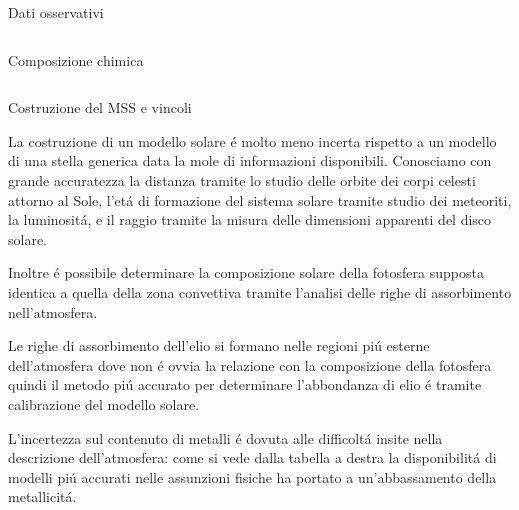 \documentclass[10pt,xcolor={usenames},fleqn,mathserif,serif]{beamer}
\begin{document}
\begin{frame}{Dati osservativi}
\begin{columns}
\begin{column}{0.5\textwidth}
\begin{block}{Composizione chimica}
\end{block}

\end{column}

\end{columns}

\end{frame}

\begin{wordonframe}{Costruzione del MSS e vincoli}

La costruzione di un modello solare \'e molto meno incerta rispetto a un modello di una stella generica data la mole di informazioni disponibili. Conosciamo con grande accuratezza la distanza tramite lo studio delle orbite dei corpi celesti attorno al Sole, l'et\'a di formazione del sistema solare tramite studio dei meteoriti, la luminosit\'a, e il raggio tramite la misura delle dimensioni apparenti del disco solare.

Inoltre \'e possibile determinare la composizione solare della fotosfera supposta identica a quella della zona convettiva tramite l'analisi delle righe di assorbimento nell'atmosfera.

Le righe di assorbimento dell'elio si formano nelle regioni pi\'u esterne dell'atmosfera dove non \'e ovvia la relazione con la composizione della fotosfera quindi il metodo pi\'u accurato per determinare l'abbondanza di elio \'e tramite calibrazione del modello solare.

L'incertezza sul contenuto di metalli \'e dovuta alle difficolt\'a insite nella descrizione dell'atmosfera: come si vede dalla tabella a destra la disponibilit\'a di modelli pi\'u accurati nelle assunzioni fisiche ha portato a un'abbassamento della metallicit\'a. 

\end{wordonframe}
\end{document}
